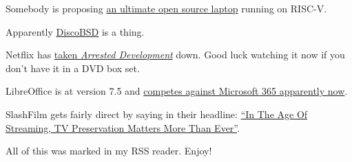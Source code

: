 Somebody is proposing
\href{https://www.tomshardware.com/news/risc-v-laptop-easy-to-build-and-upgrade}{an
ultimate open source laptop} running on RISC-V.

Apparently
\href{https://github.com/chettrick/discobsd?utm_source=discoverbsd}{DiscoBSD}
is a thing.

Netflix has
\href{https://variety.com/2023/tv/news/netflix-removing-arrested-development-original-seasons-1235521721/}{taken
\emph{Arrested Development}} down. Good luck watching it now if you
don't have it in a DVD box set.

LibreOffice is at version 7.5 and
\href{https://www.techradar.com/news/libreoffice-still-thinks-it-can-steal-you-away-from-microsoft-365-or-google-workspace}{competes
against Microsoft 365 apparently now}.

SlashFilm gets fairly direct by saying in their headline:
\href{https://www.slashfilm.com/1187497/in-the-age-of-streaming-tv-preservation-matters-more-than-ever/}{``In
The Age Of Streaming, TV Preservation Matters More Than Ever''}.

All of this was marked in my RSS reader. Enjoy!
